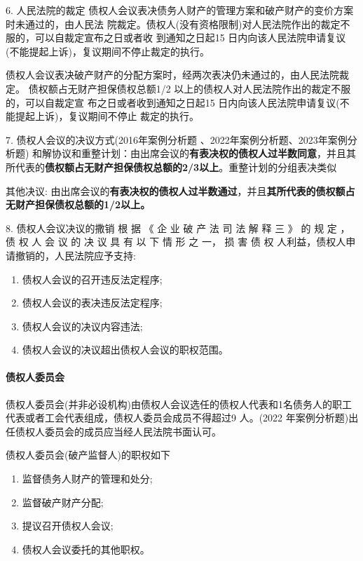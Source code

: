 \documentclass[UTF8,12pt]{ctexart}
\numberwithin{equation}{section} %
\numberwithin{figure}{section}
\numberwithin{table}{section}
\begin{document}
	
	6. 人民法院的裁定
	债权人会议表决债务人财产的管理方案和破产财产的变价方案时未通过的，由人民法 院裁定。债权人(没有资格限制)对人民法院作出的裁定不服的，可以自裁定宣布之日或者收 到通知之日起15 日内向该人民法院申请复议(不能提起上诉)，复议期间不停止裁定的执行。
	
	债权人会议表决破产财产的分配方案时，经两次表决仍未通过的，由人民法院裁定。 债权额占无财产担保债权总额1/2 以上的债权人对人民法院作出的裁定不服的，可以自裁定宣 布之日或者收到通知之日起15 日内向该人民法院申请复议(不能提起上诉)，复议期间不停止 裁定的执行。
	
	7. 债权人会议的决议方式(2016年案例分析题 、2022年案例分析题、2023年案例分析题)
	和解协议和重整计划：由出席会议的\textbf{有表决权的债权人过半数同意}，并且其所代表的\textbf{债权额占无财产担保债权总额的2/3以上}。重整计划的分组表决类似
	
	
	其他决议: 由出席会议的\textbf{有表决权的债权人过半数通过}，并且\textbf{其所代表的债权额占无财产担保债权总额的1/2以上。}

	8. 债权人会议决议的撒销
	根 据 《 企 业 破 产 法 司 法 解 释 三 》 的 规 定 ， 债 权 人 会 议 的 决 议 具 有 以 下 情 形 之 一， 损 害 债 权 人利益，债权人申请撤销的，人民法院应予支持:
	\begin{enumerate}
		\item 债权人会议的召开违反法定程序;
		
		\item 债权人会议的表决违反法定程序;
		
		\item 债权人会议的决议内容违法;
		
		\item 债权人会议的决议超出债权人会议的职权范围。
	\end{enumerate}
	
	
	\paragraph{债权人委员会}
	债权人委员会(并非必设机构)由债权人会议选任的债权人代表和1名债务人的职工代表或者工会代表组成，债权人委员会成员不得超过9 人。(2022 年案例分析题)出任债权人委员会的成员应当经人民法院书面认可。
	
	债权人委员会(破产监督人)的职权如下
	\begin{enumerate}
		\item 监督债务人财产的管理和处分;
		
		\item 监督破产财产分配;
		
		\item 提议召开债权人会议;
		
		\item 债权人会议委托的其他职权。
	\end{enumerate}
\end{document}
